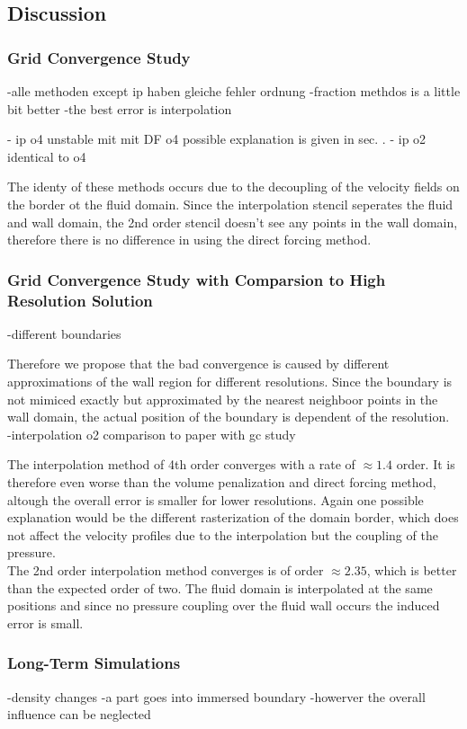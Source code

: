 \clearpage

\subsection{Discussion}
\subsubsection{Grid Convergence Study}


-alle methoden except ip haben gleiche fehler ordnung
-fraction methdos is a little bit better
-the best error is interpolation

- ip o4 unstable mit mit DF o4 possible explanation is given in sec. .
- ip o2 identical to o4


 The identy of these methods occurs due to the decoupling of the velocity fields
on the border ot the fluid domain. Since the interpolation stencil seperates the fluid and wall domain, the 2nd order
stencil doesn't see any points in the wall domain, therefore there is no difference in using the direct forcing method.\\

\subsubsection{Grid Convergence Study with Comparsion to High Resolution Solution}
\label{vali:hpflow_discussion}

-different boundaries

Therefore we propose that the bad convergence is caused by different approximations of the wall region for different resolutions.
Since the boundary is not mimiced exactly but approximated by the nearest neighboor points in the wall domain, the actual position
of the boundary is dependent of the resolution.\\

-interpolation o2  comparison to paper with gc study

The interpolation method of 4th order converges with a rate of $\approx 1.4$ order. It is therefore even worse than the volume penalization and
direct forcing method, altough the overall error is smaller for lower resolutions. Again one possible explanation would be the different rasterization
of the domain border, which does not affect the velocity profiles due to the interpolation but the coupling of the pressure.\\
The 2nd order interpolation method converges is of order $\approx 2.35$, which is better than the expected order of two.
The fluid domain is interpolated at the same positions and since no pressure coupling over the fluid wall occurs the induced error is small.

\subsubsection{Long-Term Simulations}
-density changes
-a part goes into immersed boundary
-howerver the overall influence can be neglected


